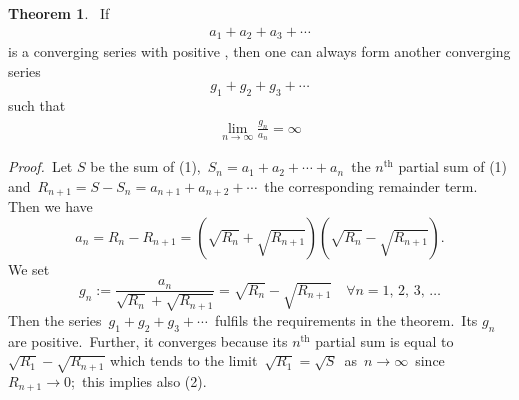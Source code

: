 \documentclass[12pt]{article}
\theoremstyle{definition}
\newtheorem*{thmplain}{Theorem}
\begin{document}
\begin{thmplain}
\, If 
\begin{align}
a_1\!+\!a_2\!+\!a_3\!+\cdots
\end{align}
is a converging series with positive , then one can always form another converging series
$$g_1\!+\!g_2\!+\!g_3\!+\cdots$$
such that 
\begin{align}
\lim_{n\to\infty}\frac{g_n}{a_n} = \infty
\end{align}
\end{thmplain}

{\em Proof.}\, Let $S$ be the sum of (1),\, $S_n = a_1\!+\!a_2\!+\cdots+\!a_n$\, the $n^\mathrm{th}$ partial sum of (1) and\, $R_{n+1} = S\!-\!S_n = a_{n+1}\!+\!a_{n+2}\!+\cdots$\, the corresponding remainder term.\, Then we have 
$$a_n = R_n\!-\!R_{n+1} = (\sqrt{R_n}\!+\!\sqrt{R_{n+1}})(\sqrt{R_n}\!-\!\sqrt{R_{n+1}}).$$
We set
$$g_n := \frac{a_n}{\sqrt{R_n}\!+\!\sqrt{R_{n+1}}} 
= \sqrt{R_n}\!-\!\sqrt{R_{n+1}}
\quad \forall n = 1,\,2,\,3,\,\ldots$$
Then the series\, $g_1\!+\!g_2\!+\!g_3\!+\cdots$\, fulfils the requirements in the theorem.\, Its  $g_n$ are positive.\, Further, it converges because its $n^\mathrm{th}$ partial sum is equal to 
$\sqrt{R_1}\!-\!\sqrt{R_{n+1}}$ which tends to the limit\, 
$\sqrt{R_1} = \sqrt{S}$\, as\, $n\to\infty$\, since\, $R_{n+1}\to 0$;\, this implies also (2).
\end{document}
